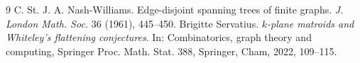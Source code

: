 \begin{thebibliography}{9}
 C. St. J. A. Nash-Williams. Edge-disjoint spanning trees of finite graphs. \emph{J. London Math. Soc.} 36 (1961), 445--450.
 Brigitte Servatius. \emph{$k$-plane matroids and Whiteley's flattening conjectures}. In: Combinatorics, graph theory and computing, Springer Proc. Math. Stat. 388, Springer, Cham, 2022, 109--115.
\end{thebibliography}

